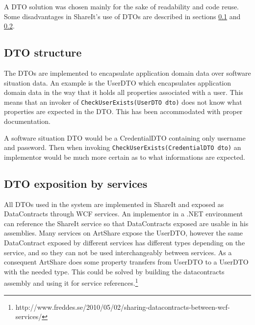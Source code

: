 \documentclass[../report.tex]{subfiles}
\begin{document}
A DTO solution was chosen mainly for the sake of readability and code reuse. Some disadvantages in ShareIt's use of DTOs are described in sections \ref{sec:dtoStructure} and \ref{sec:dtoExposition}.

\subsection{DTO structure}
\label{sec:dtoStructure}

The DTOs are implemented to encapsulate application domain data over software situation data. An example is the UserDTO which encapsulates application domain data in the way that it holds all properties associated with a user. This means that an invoker of \texttt{CheckUserExists(UserDTO dto)} does not know what properties are expected in the DTO. This has been accommodated with proper documentation.

A software situation DTO would be a CredentialDTO containing only username and password. Then when invoking \texttt{CheckUserExists(CredentialDTO dto)} an implementor would be much more certain as to what informations are expected.






\subsection{DTO exposition by services}
\label{sec:dtoExposition}

All DTOs used in the system are implemented in ShareIt and exposed as DataContracts through WCF services. An implementor in a .NET environment can reference the ShareIt service so that DataContracts exposed are usable in his assemblies. Many services on ArtShare expose the UserDTO, however the same DataContract exposed by different services has different types depending on the service, and so they can not be used interchangeably between services. As a consequent ArtShare does some property transfers from UserDTO to a UserDTO with the needed type. This could be solved by building the datacontracts assembly and using it for service references.\footnote{http://www.freddes.se/2010/05/02/sharing-datacontracts-between-wcf-services/}
\end{document}
